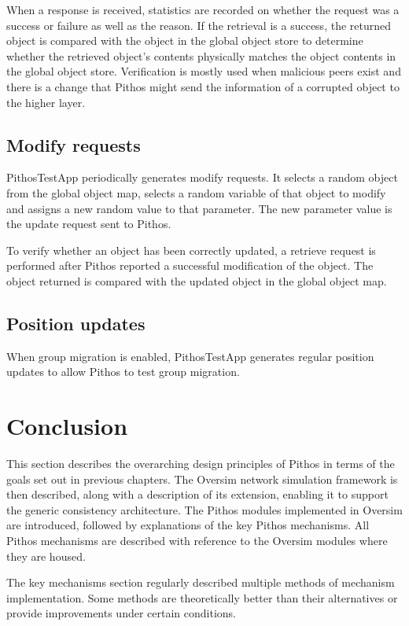 When a response is received, statistics are recorded on whether the request was a success or failure as well as the reason. If the retrieval is a success, the returned object is compared with the object in the global object store to determine whether the retrieved object's contents physically matches the object contents in the global object store. Verification is mostly used when malicious peers exist and there is a change that Pithos might send the information of a corrupted object to the higher layer.

\subsection{Modify requests}

PithosTestApp periodically generates modify requests. It selects a random object from the global object map, selects a random variable of that object to modify and assigns a new random value to that parameter. The new parameter value is the update request sent to Pithos.

To verify whether an object has been correctly updated, a retrieve request is performed after Pithos reported a successful modification of the object. The object returned is compared with the updated object in the global object map.

\subsection{Position updates}

When group migration is enabled, PithosTestApp generates regular position updates to allow Pithos to test group migration.

\section{Conclusion}

This section describes the overarching design principles of Pithos in terms of the goals set out in previous chapters. The Oversim network simulation framework is then described, along with a description of its extension, enabling it to support the generic consistency architecture. The Pithos modules implemented in Oversim are introduced, followed by explanations of the key Pithos mechanisms. All Pithos mechanisms are described with reference to the Oversim modules where they are housed.

The key mechanisms section regularly described multiple methods of mechanism implementation. Some methods are theoretically better than their alternatives or provide improvements under certain conditions.
